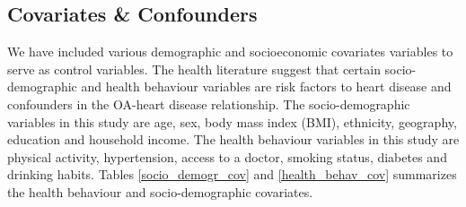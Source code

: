 \subsection{Covariates \& Confounders}
We have included various demographic and socioeconomic covariates variables to serve as control variables. The health literature suggest that  certain socio-demographic and health behaviour variables are risk factors to heart disease and confounders in the OA-heart disease relationship. The socio-demographic variables in this study are age, sex, body mass index (BMI), ethnicity, geography, education and household income. The health behaviour variables in this study are physical activity, hypertension, access to a doctor, smoking status, diabetes and drinking habits. Tables \ref{socio_demogr_cov} and \ref{health_behav_cov} summarizes the health behaviour and socio-demographic covariates. 
